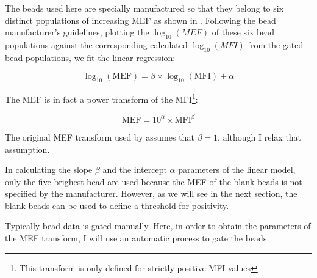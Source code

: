 The beads used here are specially manufactured so that they belong to six distinct populations of increasing MEF as shown in .
Following the bead manufacturer's guidelines, plotting the $\log_{10}(MEF)$ of these six bead populations against
the corresponding calculated $\log_{10}(MFI)$ from the gated bead populations, we fit the linear regression:

\begin{equation}
    \log_{10}(\text{MEF})=\beta \times \log_{10}(\text{MFI}) + \alpha
\label{equ:MEF}
\end{equation}

The MEF is in fact a power transform of the MFI\footnote{This transform is only defined for strictly positive MFI values}:

\[
    \text{MEF}= 10^\alpha \times \text{MFI}^\beta
\]

The original MEF transform used by \citet{Dendrou:2009bl} assumes that $\beta=1$,
although I relax that assumption.

In calculating the slope $\beta$ and the intercept $\alpha$ parameters of the linear model,
only the five brighest bead are used because the MEF of the blank beads is not specified by the manufacturer.
However, as we will see in the next section, the blank beads can be used to define a threshold for positivity.

Typically bead data is gated manually.
Here, in order to obtain the parameters of the MEF transform, I will use an automatic process to gate the beads.

